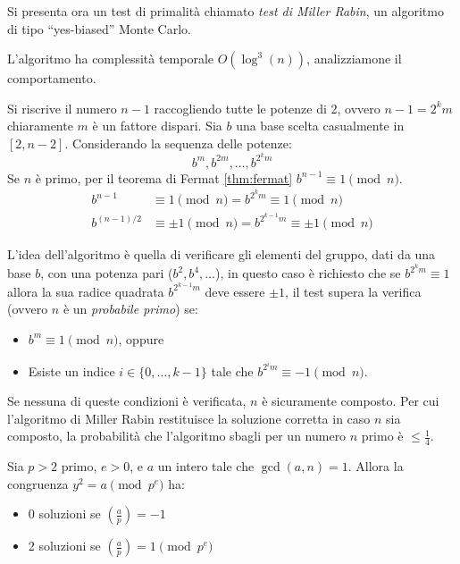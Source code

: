 \noindent Si presenta ora un test di primalità chiamato \emph{test di Miller Rabin}, un algoritmo di tipo ``yes-biased'' Monte Carlo. 



\noindent
L'algoritmo ha complessità temporale $O(\log^3(n))$, analizziamone il comportamento.


\vspace{1em}\noindent Si riscrive il numero $n-1$ raccogliendo tutte le potenze di 2, ovvero $n-1 = 2^km$ chiaramente $m$ è un fattore dispari.
Sia $b$ una base scelta casualmente in $[2, n-2]$. Considerando la sequenza delle potenze:
\[ b^m, b^{2m}, \dots, b^{2^km} \]
Se $n$ è primo, per il teorema di Fermat \ref{thm:fermat} $b^{n-1} \equiv 1 \pmod n$.
\begin{align*}
    b^{n-1} &\equiv 1 \pmod n = b^{2^km} \equiv 1 \pmod n\\
    b^{(n-1)/2} &\equiv \pm 1 \pmod n = b^{2^{k-1}m} \equiv \pm 1 \pmod n
\end{align*}

L'idea dell'algoritmo è quella di verificare gli elementi del gruppo, dati da una base $b$, con una potenza pari ($b^2,b^4,\dots$), in questo caso è richiesto che se $b^{2^km}\equiv 1$ allora la sua radice quadrata $b^{2^{k-1}m}$ deve essere $\pm 1$, il test supera la verifica (ovvero $n$ è un \emph{probabile primo}) se:
\begin{itemize}
    \item $b^m \equiv 1 \pmod n$, oppure
    \item Esiste un indice $i \in \{0, \dots, k-1\}$ tale che $b^{2^i m} \equiv -1 \pmod n$.
\end{itemize}
Se nessuna di queste condizioni è verificata, $n$ è sicuramente composto. Per cui l'algoritmo di Miller Rabin restituisce la soluzione corretta in caso $n$ sia composto, la probabilità che l'algoritmo sbagli per un numero $n$ primo è $\leq \frac{1}{4}$.


\begin{theorem}
    Sia $p>2$ primo, $e>0$, e $a$ un intero tale che $\gcd(a,n) = 1$. Allora la  congruenza $y^2 = a \pmod {p^e}$ ha:~
    \begin{itemize}
        \item 0 soluzioni se $\left( \frac{a}{p}\right) = -1$
        \item 2 soluzioni se $\left( \frac{a}{p}\right) = 1 \pmod {p^e}$
    \end{itemize}
\end{theorem}

